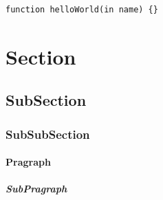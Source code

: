 \begin{lstlisting}[float=tbh, mathescape=true, captionpos=b, caption=foo, label=pseudo_code, language=pseudo]
  function helloWorld(in name) {}
\end{lstlisting}



\section{Section}
\subsection{SubSection}
\subsubsection{SubSubSection}
\paragraph{Pragraph}
\subparagraph{SubPragraph}
